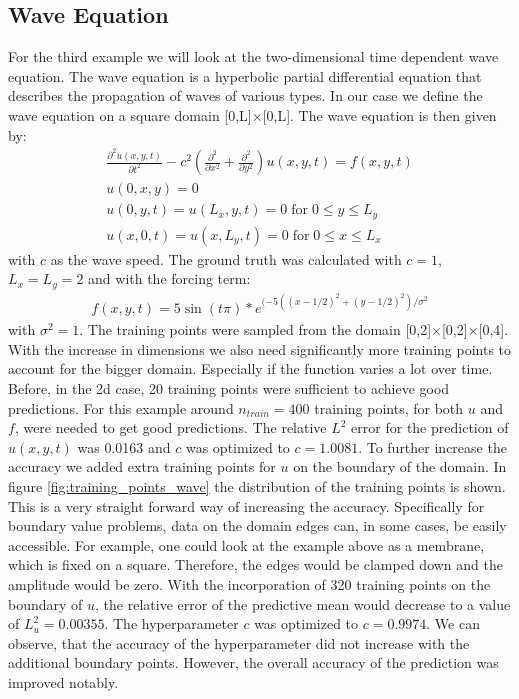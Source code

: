 \documentclass{article}
\begin{document}
\subsection{Wave Equation}
For the third example we will look at the two-dimensional time dependent wave equation. The wave equation is a hyperbolic partial differential equation that describes the propagation of waves of various types. In our case we define the wave equation on a square domain [0,L]×[0,L]. The wave equation is then given by:
\begin{equation}
    \begin{aligned}
    \frac{\partial^2 u(x,y,t)}{\partial t^2} - c^2\left(\frac{\partial^2}{\partial x^2} +\frac{\partial^2}{\partial y^2}\right)u(x,y,t) = f(x,y,t) \\ 
    u(0,x,y) = 0\\ 
    u(0,y,t)=u(L_x,y,t)=0 \; \mathrm{for} \;0 \leq y \leq L_y\\
    u(x,0,t)=u(x,L_y,t)=0 \; \mathrm{for}\; 0 \leq x \leq L_x
    \end{aligned}
\end{equation}
with $c$ as the wave speed. The ground truth was calculated with $c = 1$, $L_x = L_y = 2$ and with the forcing term:
\begin{align}
  f(x,y,t) = 5\sin(t\pi)*e^{(-5((x - 1/2)^2 + (y - 1/2)^2)/\sigma^2}  
\end{align}
with $\sigma^2 = 1$. The training points were sampled from the domain [0,2]×[0,2]×[0,4]. With the increase in dimensions we also need significantly more training points to account for the bigger domain. Especially if the function varies a lot over time. Before, in the 2d case, 20 training points were sufficient to achieve good predictions. For this example around $n_{train} = 400$ training points, for both $u$ and $f$, were needed to get good predictions.
The relative $L^2$ error for the prediction of $u(x,y,t)$ was 0.0163 and $c$ was optimized to $c = 1.0081$. To further increase the accuracy we added extra training points for $u$ on the boundary of the domain. In figure \ref{fig:training_points_wave} the distribution of the training points is shown. This is a very straight forward way of increasing the accuracy. Specifically for boundary value problems, data on the domain edges can, in some cases, be easily accessible. For example, one could look at the example above as a membrane, which is fixed on a square. Therefore, the edges would be clamped down and the amplitude would be zero. With the incorporation of 320 training points on the boundary of $u$, the relative error of the predictive mean would decrease to a value of $L^2_u = 0.00355$. The hyperparameter $c$ was optimized to $c = 0.9974$. We can observe, that the accuracy of the hyperparameter did not increase with the additional boundary points. However, the overall accuracy of the prediction was improved notably.
\end{document}
